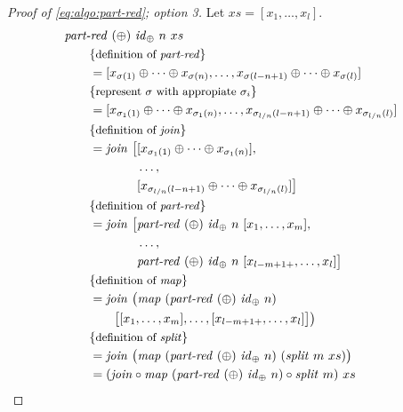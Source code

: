 \begin{proof}[Proof of \autoref{eq:algo:part-red}; option 3]
  Let $xs = [x_1, \ldots, x_l]$.
  \begin{align*}
    &\partRed\ (\oplus)\ \id_\oplus\ n\ xs\\
    &\qquad \comment{definition of \partRed}\\
    &\qquad = [x_{\sigma(1)} \oplus \dots \oplus x_{\sigma(n)}, \ldots, x_{\sigma(l-n+1)} \oplus \dots \oplus x_{\sigma(l)}]\\
    &\qquad \comment{represent $\sigma$ with appropiate $\sigma_i$}\\
    &\qquad = [x_{\sigma_1(1)} \oplus \dots \oplus x_{\sigma_1(n)}, \ldots, x_{\sigma_{l/n}(l-n+1)} \oplus \dots \oplus x_{\sigma_{l/n}(l)}]\\
    &\qquad \comment{definition of \join}\\
    &\qquad = \join\
      \begin{aligned}[t]
        \big[&[x_{\sigma_1(1)} \oplus \dots \oplus x_{\sigma_1(n)}],\\
             &\ldots,\\
             &[x_{\sigma_{l/n}(l-n+1)} \oplus \dots \oplus x_{\sigma_{l/n}(l)}]\big]
      \end{aligned}\\
    &\qquad \comment{definition of \partRed}\\
    &\qquad = \join\
      \begin{aligned}[t]
        \big[&\partRed\ (\oplus)\ \id_\oplus\ n\ [x_1, \ldots, x_m],\\
             &\ldots,\\
             &\partRed\ (\oplus)\ \id_\oplus\ n\ [x_{l-m+1+}, \ldots, x_l]\big]
      \end{aligned}\\
    &\qquad \comment{definition of \map}\\
    &\qquad = \join\ \big(\map\ (\partRed\ (\oplus)\ \id_\oplus\ n)\\
    &\qquad\qquad \big[[x_1, \ldots, x_m], \ldots, [x_{l-m+1+}, \ldots, x_l]\big]\big)\\
    &\qquad \comment{definition of \splitN}\\
    &\qquad = \join\ \big(\map\ (\partRed\ (\oplus)\ \id_\oplus\ n)\ (\splitN\ m\ xs)\big)\\
    &\qquad = (\join \circ \map\ (\partRed\ (\oplus)\ \id_\oplus\ n) \circ \splitN\ m)\ xs
  \end{align*}
\end{proof}
